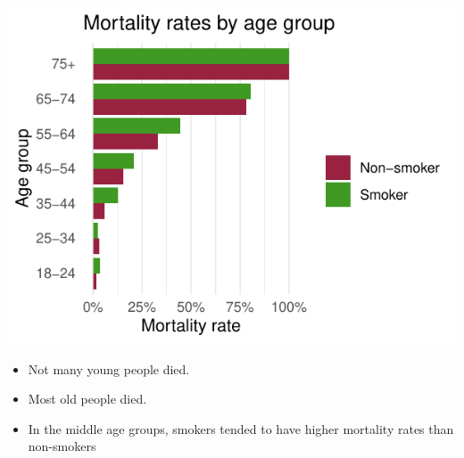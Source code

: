 \documentclass[a4paper]{article}\usepackage[]{graphicx}\usepackage[]{xcolor}
\makeatletter
\def\maxwidth{ %
  \ifdim\Gin@nat@width>\linewidth
    \linewidth
  \else
    \Gin@nat@width
  \fi
}
\makeatother
\begin{document}
\begin{Schunk}
{\centering \includegraphics[width=\maxwidth]{figure/listings-unnamed-chunk-13-1} 

}

\end{Schunk}
\begin{itemize}
	\item Not many young people died.
	\item Most old people died.
	\item In the middle age groups, smokers tended to have higher mortality rates than non-smokers
\end{itemize}
\end{document}
